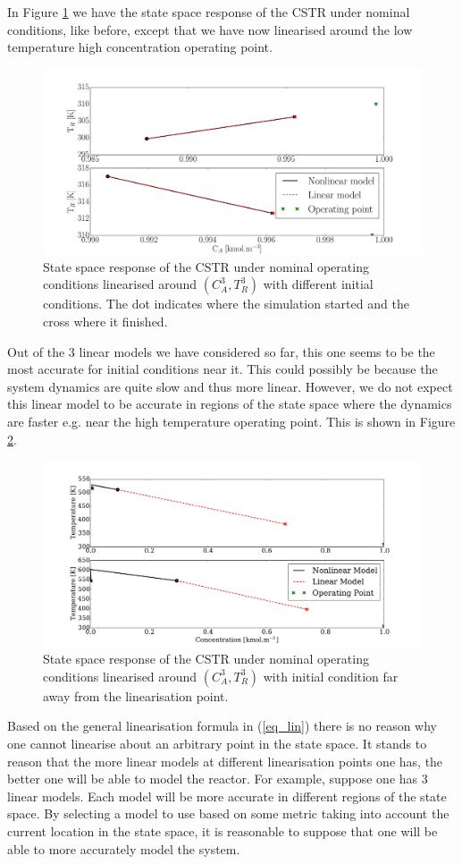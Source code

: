 \documentclass[../masters.tex]{subfiles}
\begin{document}
In Figure \ref{fig_cstr_lin_3} we have the state space response of the CSTR under nominal conditions, like before, except that we have now linearised around the low temperature high concentration operating point. 
\begin{figure}[H] 
\centering
\includegraphics[scale=0.3]{cstr_lin_3.pdf}
\caption{State space response of the CSTR under nominal operating conditions linearised around $(C_A^3,T_R^3)$ with different initial conditions. The dot indicates where the simulation started and the cross where it finished.}
\label{fig_cstr_lin_3}
\end{figure}
Out of the 3 linear models we have considered so far, this one seems to be the most accurate for initial conditions near it. This could possibly be because the system dynamics are quite slow and thus more linear. However, we do not expect this linear model to be accurate in regions of the state space where the dynamics are faster e.g. near the high temperature operating point. This is shown in Figure \ref{fig_cstr_lin_4}. 
\begin{figure}[H] 
\centering
\includegraphics[scale=0.3]{cstr_lin_4.pdf}
\caption{State space response of the CSTR under nominal operating conditions linearised around $(C_A^3,T_R^3)$ with initial condition far away from the linearisation point.}
\label{fig_cstr_lin_4}
\end{figure}
Based on the general linearisation formula in (\ref{eq_lin}) there is no reason why one cannot linearise about an arbitrary point in the state space. It stands to reason that the more linear models at different linearisation points one has, the better one will be able to model the reactor. For example, suppose one has 3 linear models. Each model will be more accurate in different regions of the state space. By selecting a model to use based on some metric taking into account the current location in the state space, it is reasonable to suppose that one will be able to more accurately model the system. 
\end{document}
